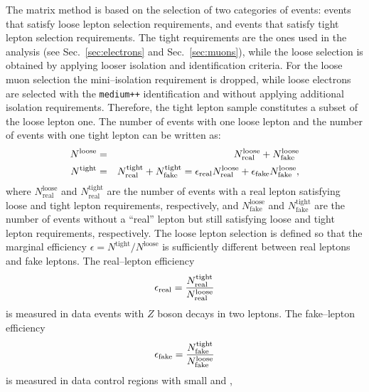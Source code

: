 The matrix method is based on the selection of two categories of
events: events that satisfy loose lepton selection requirements, and
events that satisfy tight lepton selection requirements. The tight
requirements are the ones used in the analysis (see
Sec.~\ref{sec:electrons} and Sec.~\ref{sec:muons}), while the loose
selection is obtained by applying looser isolation and identification
criteria. For the loose muon selection the mini--isolation requirement
is dropped, while loose electrons are selected with the
\texttt{medium++} identification and without applying additional
isolation requirements.
Therefore, the tight lepton sample constitutes a subset of
the loose lepton one.
The number of events with one loose lepton and
the number of events with one tight lepton can be written as:
%                                                                                             
\begin{eqnarray}
  N^\mathrm{loose}
  & = & N^\mathrm{loose}_\mathrm{real}
  + N^{\mathrm{loose}}_\mathrm{fake} \nonumber \\
  N^\mathrm{tight}
  & = & N^\mathrm{tight}_\mathrm{real}
  + N^{\mathrm{tight}}_\mathrm{fake} =
  \epsilon_{\mathrm{real}}{}N^\mathrm{loose}_\mathrm{real} + \epsilon_{\mathrm{fake}}{}N^\mathrm{loose}_\mathrm{fake},
  \label{eqn:intro-mm-Nloose}
\end{eqnarray}
%
where $N^\mathrm{loose}_\mathrm{real}$ and
$N^\mathrm{tight}_\mathrm{real}$ are the number of events with a real
lepton satisfying loose and tight lepton requirements, respectively,
and $N^\mathrm{loose}_\mathrm{fake}$ and
$N^\mathrm{tight}_\mathrm{fake}$ are the number of events without a ``real''
lepton but still satisfying loose and tight lepton requirements, respectively.
The loose lepton selection is defined so that the marginal efficiency
$\epsilon=N^\mathrm{tight}/N^\mathrm{loose}$ is sufficiently different between real
leptons and fake leptons. The real--lepton efficiency
%                                                                                             
\begin{equation}
  \epsilon_{\mathrm{real}}{}
  = \frac{N^\mathrm{tight}_\mathrm{real}}{N^\mathrm{loose}_\mathrm{real}}
\end{equation}
is measured in data events with $Z$ boson decays in two leptons.
The fake--lepton efficiency
\begin{equation}
  \epsilon_{\mathrm{fake}}{}
  = \frac{N^\mathrm{tight}_\mathrm{fake}}{N^\mathrm{loose}_\mathrm{fake}}
  \label{eqn:intro-mm-real-fake}
\end{equation}
is measured in data control regions with small \met{} and \mtw{},
